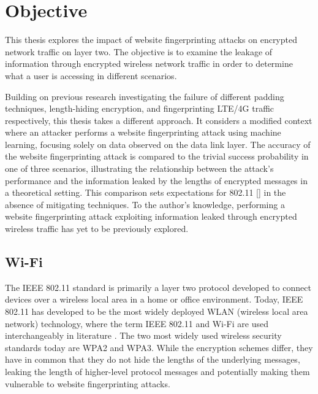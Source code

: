 \section{Objective\label{sec:objective-intro}}

This thesis explores the impact of website fingerprinting attacks on encrypted network traffic on layer two. The objective is to examine the leakage of information through encrypted wireless network traffic in order to determine what a user is accessing in different scenarios.

Building on previous research \cite{DBLP:conf/sp/DyerCRS12, DBLP:conf/ctrsa/GellertJLN22, kohls2019lost} investigating the failure of different padding techniques, length-hiding encryption, and fingerprinting LTE/4G traffic respectively, this thesis takes a different approach. It considers a modified context where an attacker performs a website fingerprinting attack using machine learning, focusing solely on data observed on the data link layer. The accuracy of the website fingerprinting attack is compared to the trivial success probability in one of three scenarios, illustrating the relationship between the attack's performance and the information leaked by the lengths of encrypted messages in a theoretical setting. This comparison sets expectations for 802.11 [] in the absence of mitigating techniques. To the author's knowledge, performing a website fingerprinting attack exploiting information leaked through encrypted wireless traffic has yet to be previously explored.

\subsection{Wi-Fi\label{subsec:wireless-network}}

The IEEE 802.11 standard is primarily a layer two protocol developed to connect devices over a wireless local area in a home or office environment. Today, IEEE 802.11 has developed to be the most widely deployed WLAN (wireless local area network) technology, where the term IEEE 802.11 and Wi-Fi are used interchangeably in literature \cite{banerji2013ieee}. The two most widely used wireless security standards today are WPA2 and WPA3. While the encryption schemes differ, they have in common that they do not hide the lengths of the underlying messages, leaking the length of higher-level protocol messages and potentially making them vulnerable to website fingerprinting attacks.

